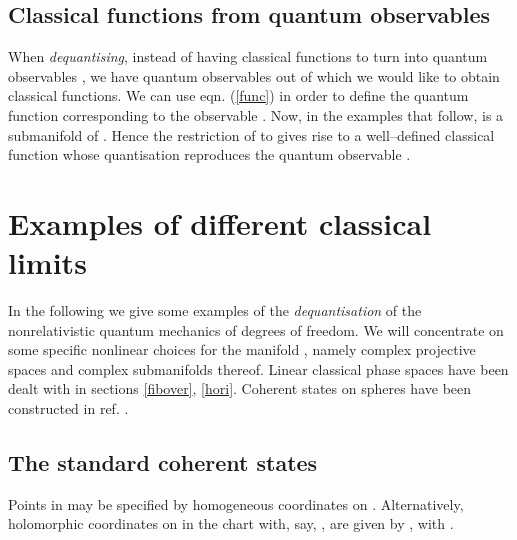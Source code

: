 \documentclass[a4paper,a4paper]{article}
\begin{document}
\subsection{Classical functions from quantum observables}\label{clafunct}

When {\it dequantising}, instead of having classical functions 
\coordHE{} 
to turn into quantum observables \coordHE{}, we have quantum observables \coordHE{} out of which 
we would like to obtain classical functions. We can use eqn. (\ref{func}) in order to 
define the quantum function \coordHE{} corresponding 
to the observable \coordHE{}. Now, in the examples that follow,
\coordHE{} is a submanifold of \coordHE{}. 
Hence the restriction of \coordHE{} to \coordHE{} gives rise to 
a well--defined classical function \coordHE{} 
whose quantisation reproduces the quantum observable \coordHE{}.

\section{Examples of different classical limits}\label{exam}

In the following we give some examples of the {\it dequantisation} 
of the nonrelativistic quantum mechanics of \coordHE{} degrees of freedom. We will 
concentrate on some specific nonlinear choices for the manifold \coordHE{}, 
namely  complex projective spaces \coordHE{} and complex submanifolds 
thereof. Linear classical phase spaces have been dealt with in sections 
\ref{fibover}, \ref{hori}. Coherent states on spheres have been constructed 
in ref. \cite{SPHERES}.

\subsection{The standard coherent states}\label{stan}

Points in \coordHE{} may be specified by homogeneous coordinates 
\myHighlight{$[w_0:\ldots:w_n]$}\coordHE{} on \coordHE{}. Alternatively, holomorphic coordinates 
on \coordHE{} in the chart with, say, \coordHE{}, are given by \coordHE{}, 
with \coordHE{}. 
\end{document}
